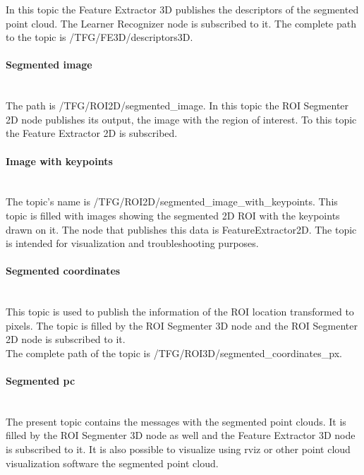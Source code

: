 		In this topic the Feature Extractor 3D publishes the descriptors of the segmented point cloud. The Learner Recognizer node is subscribed to it. 
		The complete path to the topic is /TFG/FE3D/descriptors3D.\\


	\paragraph{Segmented image}\mbox{} \\

		The path  is /TFG/ROI2D/segmented\_image. In this topic the  ROI Segmenter 2D node publishes its output, the image with the region of interest. To this topic the Feature Extractor 2D is subscribed. \\


	\paragraph{Image with keypoints}\mbox{} \\

		The topic's name is /TFG/ROI2D/segmented\_image\_with\_keypoints. This topic is filled with images showing the segmented 2D ROI with the keypoints drawn on it. The node that publishes this data is FeatureExtractor2D. The topic is intended for visualization and troubleshooting purposes. \\

	\paragraph{Segmented coordinates}\mbox{} \\

		This topic is used to publish the information of the ROI location transformed to pixels. The topic is filled by the ROI Segmenter 3D node and the ROI Segmenter 2D node is subscribed to it. 
			\\
		The complete path of the topic is /TFG/ROI3D/segmented\_coordinates\_px. 

	\paragraph{Segmented pc}\mbox{} \\

		The present topic contains the messages with the segmented point clouds. It is filled by the ROI Segmenter 3D node as well and the Feature Extractor 3D node is subscribed to it. It is also possible to visualize using rviz or other point cloud visualization software the segmented point cloud. 
		\\

